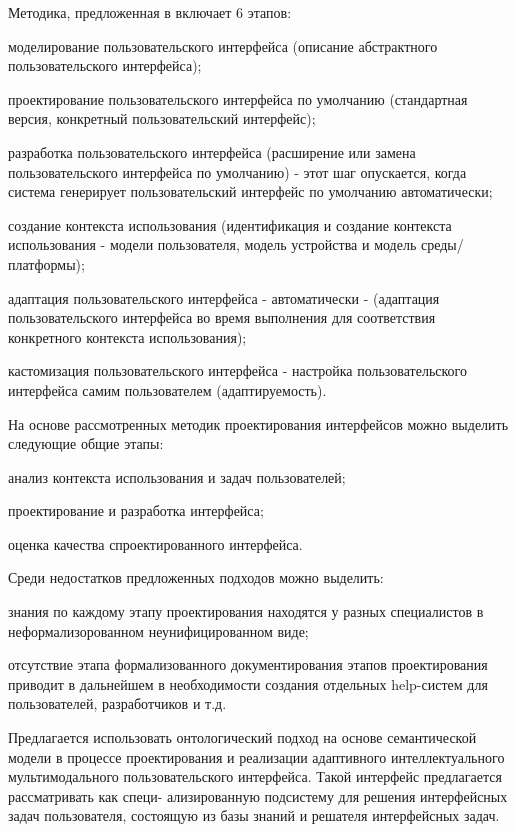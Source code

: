 Методика, предложенная в  включает 6 этапов:
\begin{textitemize}
	\item моделирование пользовательского интерфейса (описание абстрактного пользовательского интерфейса);
	\item проектирование пользовательского интерфейса по умолчанию (стандартная версия, конкретный пользовательский интерфейс);
	\item разработка пользовательского интерфейса (расширение или замена пользовательского интерфейса по умолчанию) - этот шаг опускается, когда система генерирует пользовательский интерфейс по умолчанию автоматически;
	\item создание контекста использования (идентификация и создание контекста использования - модели пользователя, модель устройства и модель среды/платформы);
	\item адаптация пользовательского интерфейса - автоматически - (адаптация пользовательского интерфейса во время выполнения для соответствия конкретного контекста использования);
	\item кастомизация пользовательского интерфейса - настройка пользовательского интерфейса самим пользователем (адаптируемость).
\end{textitemize}

На основе рассмотренных методик проектирования интерфейсов можно выделить следующие общие этапы:
\begin{textitemize}
\item анализ контекста использования и задач пользователей;
\item проектирование и разработка интерфейса;
\item оценка качества спроектированного интерфейса.
\end{textitemize}

Среди недостатков предложенных подходов можно выделить:
\begin{textitemize}
	\item знания по каждому этапу проектирования находятся у разных специалистов в неформализорованном неунифицированном виде;
	\item отсутствие этапа формализованного документирования этапов проектирования приводит в дальнейшем в необходимости создания отдельных help-систем для пользователей, разработчиков и т.д.
\end{textitemize}

Предлагается использовать онтологический подход на основе семантической модели в процессе проектирования и реализации адаптивного интеллектуального мультимодального пользовательского интерфейса. Такой интерфейс предлагается рассматривать как специ-
ализированную подсистему для решения интерфейсных задач пользователя, состоящую из базы знаний и решателя интерфейсных задач. 

